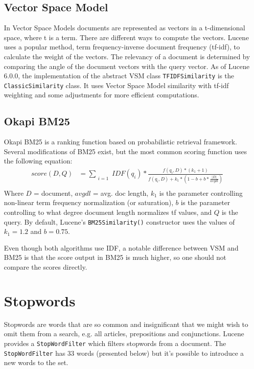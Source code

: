\documentclass[parskip=full]{aaltoseries}
\providecommand{\inlinecode}[1]{\texttt{#1}}
\providecommand{\abs}[1]{\lvert#1\rvert}
\begin{document}
\subsection{Vector Space Model}
In Vector Space Models documents are represented as vectors in a t-dimensional space, where t is a term. There are different ways to compute the vectors. Lucene uses a popular method, term frequency-inverse document frequency (tf-idf), to calculate the weight of the vectors. The relevancy of a document is determined by comparing the angle of the document vectors with the query vector. As of Lucene 6.0.0, the implementation of the abstract VSM class \inlinecode{TFIDFSimilarity} is the \inlinecode{ClassicSimilarity} class. It uses Vector Space Model similarity with tf-idf weighting and some adjustments for more efficient computations.
\newpage
\subsection{Okapi BM25}
Okapi BM25 is a ranking function based on probabilistic retrieval framework. Several modifications of BM25 exist, but the most common scoring function uses the following equation:
\begin{align*}
score(D,Q) &= \sum_{\substack{i=1}} IDF(q_i)*\frac{f(q_i,D)*(k_1+1)}{f(q_i,D)+k_1*(1-b+b*\frac{\abs{D}}{avgdl})} \\
\end{align*} 
Where $D$ = document, $avgdl$ = avg. doc length, $k_1$ is the parameter controlling non-linear term frequency normalization (or saturation), $b$ is the parameter controlling to what degree document length normalizes tf values, and $Q$ is the query. By default, Lucene's \inlinecode{BM25Similarity()} constructor uses the values of $k_1=1.2$ and $b=0.75$. 

Even though both algorithms use IDF, a notable difference between VSM and BM25 is that the score output in BM25 is much higher, so one should not compare the scores directly.
\section{Stopwords}
Stopwords are words that are so common and insignificant that we might wish to omit them from a search, e.g. all articles, prepositions and conjunctions. Lucene provides a \inlinecode{StopWordFilter} which filters stopwords from a document. The \inlinecode{StopWordFilter} has 33 words (presented below) but it's possible to introduce a new words to the set.
\end{document}

